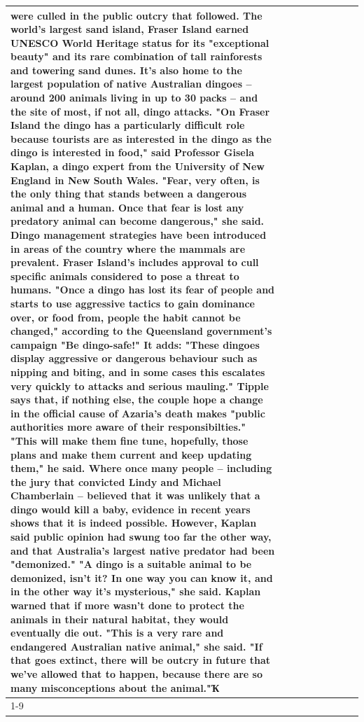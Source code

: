 \begin{table}[H]
\begin{tabular}{lllrlllll}
were culled in the public outcry that followed. The world's largest sand island, Fraser Island earned UNESCO World Heritage status for its "exceptional beauty" and its rare combination of tall rainforests and towering sand dunes. It's also home to the largest population of native Australian dingoes -- around 200 animals living in up to 30 packs -- and the site of most, if not all, dingo attacks. "On Fraser Island the dingo has a particularly difficult role because tourists are as interested in the dingo as the dingo is interested in food," said Professor Gisela Kaplan, a dingo expert from the University of New England in New South Wales. "Fear, very often, is the only thing that stands between a dangerous animal and a human. Once that fear is lost any predatory animal can become dangerous," she said. Dingo management strategies have been introduced in areas of the country where the mammals are prevalent. Fraser Island's includes approval to cull specific animals considered to pose a threat to humans. "Once a dingo has lost its fear of people and starts to use aggressive tactics to gain dominance over, or food from, people the habit cannot be changed," according to the Queensland government's campaign "Be dingo-safe!" It adds: "These dingoes display aggressive or dangerous behaviour such as nipping and biting, and in some cases this escalates very quickly to attacks and serious mauling." Tipple says that, if nothing else, the couple hope a change in the official cause of Azaria's death makes "public authorities more aware of their responsibilties." "This will make them fine tune, hopefully, those plans and make them current and keep updating them," he said. Where once many people -- including the jury that convicted Lindy and Michael Chamberlain -- believed that it was unlikely that a dingo would kill a baby, evidence in recent years shows that it is indeed possible. However, Kaplan said public opinion had swung too far the other way, and that Australia's largest native predator had been "demonized." "A dingo is a suitable animal to be demonized, isn't it? In one way you can know it, and in the other way it's mysterious," she said. Kaplan warned that if more wasn't done to protect the animals in their natural habitat, they would eventually die out. "This is a very rare and endangered Australian native animal," she said. "If that goes extinct, there will be outcry in future that we've allowed that to happen, because there are so many misconceptions about the animal."Ҡ \\
\cline{1-9}

\end{tabular}
\end{table}
